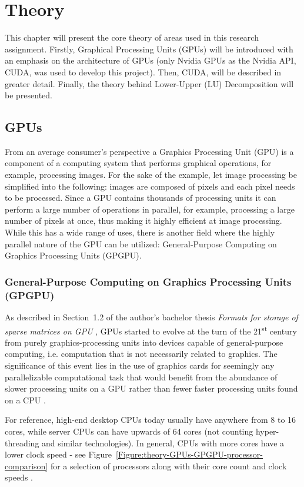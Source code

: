 \chapter{Theory}
This chapter will present the core theory of areas used in this research assignment. Firstly, Graphical Processing Units (GPUs) will be introduced with an emphasis on the architecture of GPUs (only Nvidia GPUs as the Nvidia API, CUDA, was used to develop this project). Then, CUDA, will be described in greater detail. Finally, the theory behind Lower-Upper (LU) Decomposition will be presented.

\section{GPUs}
From an average consumer's perspective a Graphics Processing Unit (GPU) is a component of a computing system that performs graphical operations, for example, processing images. For the sake of the example, let image processing be simplified into the following: images are composed of pixels and each pixel needs to be processed. Since a GPU contains thousands of processing units it can perform a large number of operations in parallel, for example, processing a large number of pixels at once, thus making it highly efficient at image processing. While this has a wide range of uses, there is another field where the highly parallel nature of the GPU can be utilized: General-Purpose Computing on Graphics Processing Units (GPGPU).

\subsection{General-Purpose Computing on Graphics Processing Units (GPGPU)}
As described in Section~1.2 of the author's bachelor thesis \emph{Formats for storage of sparse matrices on GPU} \cite{Cejka2020}, GPUs started to evolve at the turn of the 21\textsuperscript{st} century from purely graphics-processing units into devices capable of general-purpose computing, i.e. computation that is not necessarily related to graphics. The significance of this event lies in the use of graphics cards for seemingly any parallelizable computational task that would benefit from the abundance of slower processing units on a GPU rather than fewer faster processing units found on a CPU \cite{NVIDIAMay2022}.

\par For reference, high-end desktop CPUs today usually have anywhere from 8 to 16 cores, while server CPUs can have upwards of 64 cores (not counting hyper-threading and similar technologies). In general, CPUs with more cores have a lower clock speed - see Figure~\ref{Figure:theory-GPUs-GPGPU-processor-comparison} for a selection of processors along with their core count and clock speeds \cite{Glawion7March2022}.

